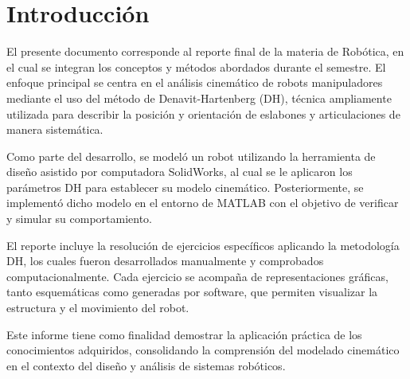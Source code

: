\chapter{Introducción} \label{chap:introduccion}

El presente documento corresponde al reporte final de la materia de Robótica, en el cual se integran los conceptos y métodos abordados durante el semestre. El enfoque principal se centra en el análisis cinemático de robots manipuladores mediante el uso del método de Denavit-Hartenberg (DH), técnica ampliamente utilizada para describir la posición y orientación de eslabones y articulaciones de manera sistemática.

Como parte del desarrollo, se modeló un robot utilizando la herramienta de diseño asistido por computadora SolidWorks, al cual se le aplicaron los parámetros DH para establecer su modelo cinemático. Posteriormente, se implementó dicho modelo en el entorno de MATLAB con el objetivo de verificar y simular su comportamiento.

El reporte incluye la resolución de ejercicios específicos aplicando la metodología DH, los cuales fueron desarrollados manualmente y comprobados computacionalmente. Cada ejercicio se acompaña de representaciones gráficas, tanto esquemáticas como generadas por software, que permiten visualizar la estructura y el movimiento del robot.

Este informe tiene como finalidad demostrar la aplicación práctica de los conocimientos adquiridos, consolidando la comprensión del modelado cinemático en el contexto del diseño y análisis de sistemas robóticos.

